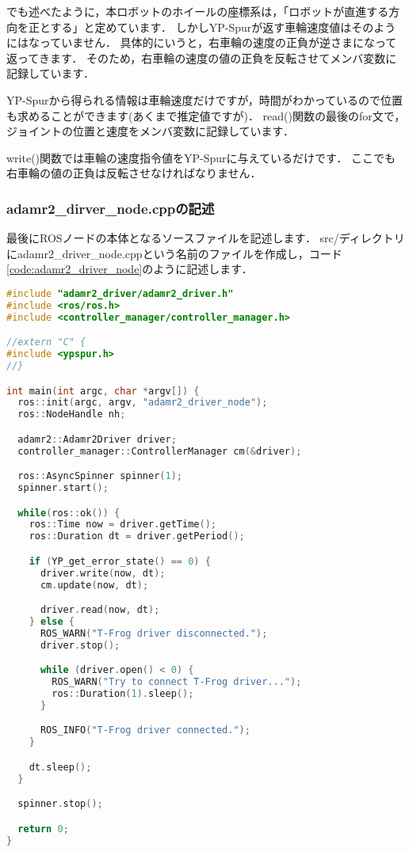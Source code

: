 \documentclass[{../../master}]{subfiles}
\begin{document}
\label{sec:add_wheel_link}でも述べたように，本ロボットのホイールの座標系は，「ロボットが直進する方向を正とする」と定めています．
しかしYP-Spurが返す車輪速度値はそのようにはなっていません．
具体的にいうと，右車輪の速度の正負が逆さまになって返ってきます．
そのため，右車輪の速度の値の正負を反転させてメンバ変数に記録しています．

YP-Spurから得られる情報は車輪速度だけですが，時間がわかっているので位置も求めることができます(あくまで推定値ですが)．
\textsf{read()}関数の最後の\textsf{for}文で，ジョイントの位置と速度をメンバ変数に記録しています．

\textsf{write()}関数では車輪の速度指令値をYP-Spurに与えているだけです．
ここでも右車輪の値の正負は反転させなければなりません．

\subsubsection{\textsf{adamr2\_dirver\_node.cpp}の記述}

最後にROSノードの本体となるソースファイルを記述します．
\textsf{src/}ディレクトリに\textsf{adamr2\_driver\_node.cpp}という名前のファイルを作成し，コード\ref{code:adamr2_driver_node}のように記述します．

\begin{lstlisting}[language=C++, label=code:adamr2_driver_node, caption=\textsf{adamr2\_driver\_node.cpp}]
#include "adamr2_driver/adamr2_driver.h"
#include <ros/ros.h>
#include <controller_manager/controller_manager.h>

//extern "C" {
#include <ypspur.h>
//}

int main(int argc, char *argv[]) {
  ros::init(argc, argv, "adamr2_driver_node");
  ros::NodeHandle nh;

  adamr2::Adamr2Driver driver;
  controller_manager::ControllerManager cm(&driver);

  ros::AsyncSpinner spinner(1);
  spinner.start();

  while(ros::ok()) {
    ros::Time now = driver.getTime();
    ros::Duration dt = driver.getPeriod();

    if (YP_get_error_state() == 0) {
      driver.write(now, dt);
      cm.update(now, dt);

      driver.read(now, dt);
    } else {
      ROS_WARN("T-Frog driver disconnected.");
      driver.stop();

      while (driver.open() < 0) {
        ROS_WARN("Try to connect T-Frog driver...");
        ros::Duration(1).sleep();
      }

      ROS_INFO("T-Frog driver connected.");
    }

    dt.sleep();
  }

  spinner.stop();

  return 0;
}
\end{lstlisting}
\end{document}
